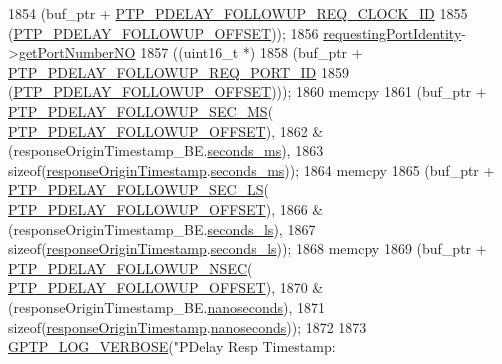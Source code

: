 \begin{DoxyCode}
1854         (buf\_ptr + \hyperlink{avbts__message_8hpp_a888c4d23c6d7221b962cdb21af1c9919}{PTP\_PDELAY\_FOLLOWUP\_REQ\_CLOCK\_ID}
1855          (\hyperlink{avbts__message_8hpp_af0f41aa83b1011ea5b8c42abddd8cd50}{PTP\_PDELAY\_FOLLOWUP\_OFFSET}));
1856     \hyperlink{class_p_t_p_message_path_delay_resp_follow_up_a27e69c7fb521ebffca13229a7c4658ce}{requestingPortIdentity}->\hyperlink{class_port_identity_ae22242effe1001dc666522e6019fd494}{getPortNumberNO}
1857         ((uint16\_t *)
1858          (buf\_ptr + \hyperlink{avbts__message_8hpp_a255d563aa29bae40a58b1855d33155fc}{PTP\_PDELAY\_FOLLOWUP\_REQ\_PORT\_ID}
1859           (\hyperlink{avbts__message_8hpp_af0f41aa83b1011ea5b8c42abddd8cd50}{PTP\_PDELAY\_FOLLOWUP\_OFFSET})));
1860     memcpy
1861         (buf\_ptr + \hyperlink{avbts__message_8hpp_a64120f45af2cdc57df2a73e8867ec2dd}{PTP\_PDELAY\_FOLLOWUP\_SEC\_MS}(
      \hyperlink{avbts__message_8hpp_af0f41aa83b1011ea5b8c42abddd8cd50}{PTP\_PDELAY\_FOLLOWUP\_OFFSET}),
1862          &(responseOriginTimestamp\_BE.\hyperlink{class_timestamp_a5d98378d782519e6f9c17db70f1620f0}{seconds\_ms}),
1863          \textcolor{keyword}{sizeof}(\hyperlink{class_p_t_p_message_path_delay_resp_follow_up_ace95ddb3f03eb3b4fcf8f73281dc0ee3}{responseOriginTimestamp}.\hyperlink{class_timestamp_a5d98378d782519e6f9c17db70f1620f0}{seconds\_ms}));
1864     memcpy
1865         (buf\_ptr + \hyperlink{avbts__message_8hpp_a9a1f675eb7706c235c9d3bb050683da2}{PTP\_PDELAY\_FOLLOWUP\_SEC\_LS}(
      \hyperlink{avbts__message_8hpp_af0f41aa83b1011ea5b8c42abddd8cd50}{PTP\_PDELAY\_FOLLOWUP\_OFFSET}),
1866          &(responseOriginTimestamp\_BE.\hyperlink{class_timestamp_a2bf200e58cd268d8b86cf93c51500a44}{seconds\_ls}),
1867          \textcolor{keyword}{sizeof}(\hyperlink{class_p_t_p_message_path_delay_resp_follow_up_ace95ddb3f03eb3b4fcf8f73281dc0ee3}{responseOriginTimestamp}.\hyperlink{class_timestamp_a2bf200e58cd268d8b86cf93c51500a44}{seconds\_ls}));
1868     memcpy
1869         (buf\_ptr + \hyperlink{avbts__message_8hpp_a405e85b9d79337d889c22e4b7959aa84}{PTP\_PDELAY\_FOLLOWUP\_NSEC}(
      \hyperlink{avbts__message_8hpp_af0f41aa83b1011ea5b8c42abddd8cd50}{PTP\_PDELAY\_FOLLOWUP\_OFFSET}),
1870          &(responseOriginTimestamp\_BE.\hyperlink{class_timestamp_a78ae11d98fcfe738239d0a853d82c84a}{nanoseconds}),
1871          \textcolor{keyword}{sizeof}(\hyperlink{class_p_t_p_message_path_delay_resp_follow_up_ace95ddb3f03eb3b4fcf8f73281dc0ee3}{responseOriginTimestamp}.\hyperlink{class_timestamp_a78ae11d98fcfe738239d0a853d82c84a}{nanoseconds}));
1872 
1873     \hyperlink{gptp__log_8hpp_add03384a2a8099b27e07d041cce77e6f}{GPTP\_LOG\_VERBOSE}(\textcolor{stringliteral}{"PDelay Resp Timestamp: %
}
\end{DoxyCode}
